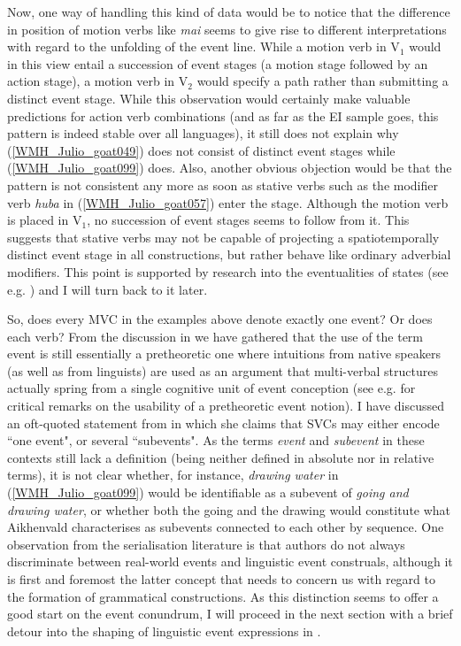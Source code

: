 Now, one way of handling this kind of data would be to notice that the difference in position of motion verbs like \textit{mai} seems to give rise to different interpretations with regard to the unfolding of the event line. While a motion verb in V$_1$ would in this view entail a succession of event stages (a motion stage followed by an action stage), a motion verb in V$_2$ would specify a path rather than submitting a distinct event stage. While this observation would certainly make valuable predictions for action verb combinations (and as far as the EI sample goes, this pattern is indeed stable over all languages), it still does not explain why (\ref{WMH_Julio_goat049}) does not consist of distinct event stages while (\ref{WMH_Julio_goat099}) does. Also, another obvious objection would be that the pattern is not consistent any more as soon as stative verbs such as the modifier verb \textit{huba} in (\ref{WMH_Julio_goat057}) enter the stage. Although the motion verb is placed in V$_1$, no succession of event stages seems to follow from it. This suggests that stative verbs may not be capable of projecting a spatiotemporally distinct event stage in all constructions, but rather behave like ordinary adverbial modifiers. This point is supported by research into the eventualities of states (see e.g. \citealt{maienborn2005limits}) and I will turn back to it later.

So, does every MVC in the  examples above denote exactly one event? Or does each verb? From the discussion in  we have gathered that the use of the term event is still essentially a pretheoretic one where intuitions from native speakers (as well as from linguists) are used as an argument that multi-verbal structures actually spring from a single cognitive unit of event conception (see e.g. \citealt{haspelmath2016serial} for critical remarks on the usability of a pretheoretic event notion). I have discussed an oft-quoted statement from \citet{Aikhenvald2006} in which she claims that SVCs may either encode ``one event", or several ``subevents". As the terms \textit{event} and \textit{subevent} in these contexts still lack a definition (being neither defined in absolute nor in relative terms), it is not clear whether, for instance, \textit{drawing water} in (\ref{WMH_Julio_goat099}) would be identifiable as a subevent of \textit{going and drawing water}, or whether both the going and the drawing would constitute what Aikhenvald characterises as subevents connected to each other by sequence. One observation from the serialisation literature is that authors do not always discriminate between real-world events and linguistic event construals, although it is first and foremost the latter concept that needs to concern us with regard to the formation of grammatical constructions. As this distinction seems to offer a good start on the event conundrum, I will proceed in the next section with a brief detour into the shaping of linguistic event expressions in .

